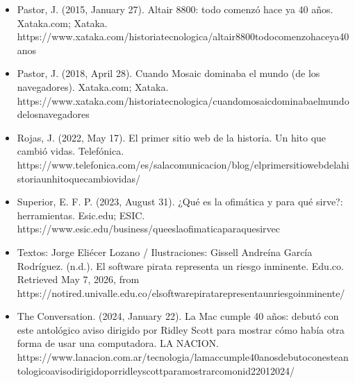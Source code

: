 \documentclass[letterpaper,10pt,spanish]{sphinxmanual}
\begin{document}
\begin{itemize}
\item {} 
\sphinxAtStartPar
Pastor, J. (2015, January 27). Altair 8800: todo comenzó hace ya 40 años. Xataka.com; Xataka. https://www.xataka.com/historia\sphinxhyphen{}tecnologica/altair\sphinxhyphen{}8800\sphinxhyphen{}todo\sphinxhyphen{}comenzo\sphinxhyphen{}hace\sphinxhyphen{}ya\sphinxhyphen{}40\sphinxhyphen{}anos

\item {} 
\sphinxAtStartPar
Pastor, J. (2018, April 28). Cuando Mosaic dominaba el mundo (de los navegadores). Xataka.com; Xataka. https://www.xataka.com/historia\sphinxhyphen{}tecnologica/cuando\sphinxhyphen{}mosaic\sphinxhyphen{}dominaba\sphinxhyphen{}el\sphinxhyphen{}mundo\sphinxhyphen{}de\sphinxhyphen{}los\sphinxhyphen{}navegadores

\item {} 
\sphinxAtStartPar
Rojas, J. (2022, May 17). El primer sitio web de la historia. Un hito que cambió vidas. Telefónica. https://www.telefonica.com/es/sala\sphinxhyphen{}comunicacion/blog/el\sphinxhyphen{}primer\sphinxhyphen{}sitio\sphinxhyphen{}web\sphinxhyphen{}de\sphinxhyphen{}la\sphinxhyphen{}historia\sphinxhyphen{}un\sphinxhyphen{}hito\sphinxhyphen{}que\sphinxhyphen{}cambio\sphinxhyphen{}vidas/

\item {} 
\sphinxAtStartPar
Superior, E. F. P. (2023, August 31). ¿Qué es la ofimática y para qué sirve?: herramientas. Esic.edu; ESIC. https://www.esic.edu/business/que\sphinxhyphen{}es\sphinxhyphen{}la\sphinxhyphen{}ofimatica\sphinxhyphen{}para\sphinxhyphen{}que\sphinxhyphen{}sirve\sphinxhyphen{}c

\item {} 
\sphinxAtStartPar
Textos: Jorge Eliécer Lozano / Ilustraciones: Gissell Andreína García Rodríguez. (n.d.). El software pirata representa un riesgo inminente. Edu.co. Retrieved May 7, 2026, from https://notired.univalle.edu.co/el\sphinxhyphen{}software\sphinxhyphen{}pirata\sphinxhyphen{}representa\sphinxhyphen{}un\sphinxhyphen{}riesgo\sphinxhyphen{}inminente/

\item {} 
\sphinxAtStartPar
The Conversation. (2024, January 22). La Mac cumple 40 años: debutó con este antológico aviso dirigido por Ridley Scott para mostrar cómo había otra forma de usar una computadora. LA NACION. https://www.lanacion.com.ar/tecnologia/la\sphinxhyphen{}mac\sphinxhyphen{}cumple\sphinxhyphen{}40\sphinxhyphen{}anos\sphinxhyphen{}debuto\sphinxhyphen{}con\sphinxhyphen{}este\sphinxhyphen{}antologico\sphinxhyphen{}aviso\sphinxhyphen{}dirigido\sphinxhyphen{}por\sphinxhyphen{}ridley\sphinxhyphen{}scott\sphinxhyphen{}para\sphinxhyphen{}mostrar\sphinxhyphen{}como\sphinxhyphen{}nid22012024/


\end{itemize}
\end{document}
